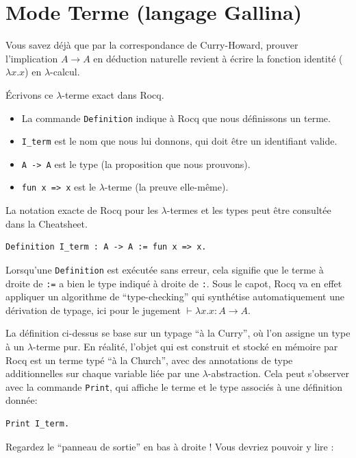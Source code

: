 \documentclass[11pt,a4paper]{article}
\begin{document}
\section{Mode Terme (langage Gallina)}

Vous savez déjà que par la correspondance de Curry-Howard, prouver l'implication $A \to A$ en déduction naturelle revient à écrire la fonction identité ($\lambda x.x$) en $\lambda$-calcul.

Écrivons ce $\lambda$-terme exact dans Rocq.

\begin{itemize}
  \item La commande \texttt{Definition} indique à Rocq que nous définissons un terme.
  \item \texttt{I\_term} est le nom que nous lui donnons, qui doit être un identifiant valide.
  \item \texttt{A -> A} est le type (la proposition que nous prouvons).
  \item \texttt{fun x => x} est le $\lambda$-terme (la preuve elle-même).
\end{itemize}

La notation exacte de Rocq pour les $\lambda$-termes et les types peut être consultée dans la Cheatsheet.

\begin{lstlisting}
Definition I_term : A -> A := fun x => x.
\end{lstlisting}

Lorsqu'une \texttt{Definition} est exécutée sans erreur, cela signifie que le terme à droite de \texttt{:=} a bien le type indiqué à droite de \texttt{:}. Sous le capot, Rocq va en effet appliquer un algorithme de ``type-checking'' qui synthétise automatiquement une dérivation de typage, ici pour le jugement $\vdash \lambda x.x : A \to A$.

La définition ci-dessus se base sur un typage ``à la Curry'', où l'on assigne un type à un $\lambda$-terme pur. En réalité, l'objet qui est construit et stocké en mémoire par Rocq est un terme typé ``à la Church'', avec des annotations de type additionnelles sur chaque variable liée par une $\lambda$-abstraction. Cela peut s'observer avec la commande \texttt{Print}, qui affiche le terme et le type associés à une définition donnée:

\begin{lstlisting}
Print I_term.
\end{lstlisting}

Regardez le ``panneau de sortie'' en bas à droite ! Vous devriez pouvoir y lire :
\end{document}
